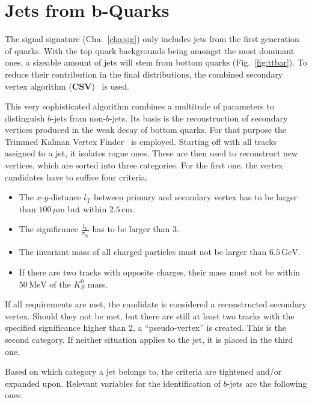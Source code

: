 \section{Jets from b-Quarks}
\label{sec:bjets}

The signal signature (Cha.~\ref{cha:sig}) only includes jets from the first generation of quarks. With the top quark backgrounds being amongst the most dominant ones, a sizeable amount of jets will stem from bottom quarks (Fig.~\ref{fig:ttbar}). To reduce their contribution in the final distributions, the combined secondary vertex algorithm (\textbf{CSV})~\cite{csvbtag} is used. 

This very sophisticated algorithm combines a multitude of parameters to distinguish $b$-jets from non-$b$-jets. Its basis is the reconstruction of secondary vertices produced in the weak decay of bottom quarks. For that purpose the Trimmed Kalman Vertex Finder~\cite{kalmanvtx} is employed. Starting off with all tracks assigned to a jet, it isolates rogue ones. These are then used to reconstruct new vertices, which are sorted into three categories. For the first one, the vertex candidates have to suffice four criteria.

\begin{itemize}
\item The $x$-$y$-distance $l_{\text{T}}$ between primary and secondary vertex has to be larger than $100\,\mu\text{m}$ but within $2.5\,\text{cm}$.
\item The significance $\frac{l_{\text{T}}}{\sigma_{l_{\text{T}}}}$ has to be larger than $3$.
\item The invariant mass of all charged particles must not be larger than $6.5\,\text{GeV}$.
\item If there are two tracks with opposite charges, their mass must not be within $50\,\text{MeV}$ of the $K^0_S$ mass.
\end{itemize}

\noindent If all requirements are met, the candidate is considered a reconstructed secondary vertex. Should they not be met, but there are still at least two tracks with the specified significance higher than 2, a ``pseudo-vertex'' is created. This is the second category. If neither situation applies to the jet, it is placed in the third one.

Based on which category a jet belongs to, the criteria are tightened and/or expanded upon. Relevant variables for the identification of $b$-jets are the following ones.

